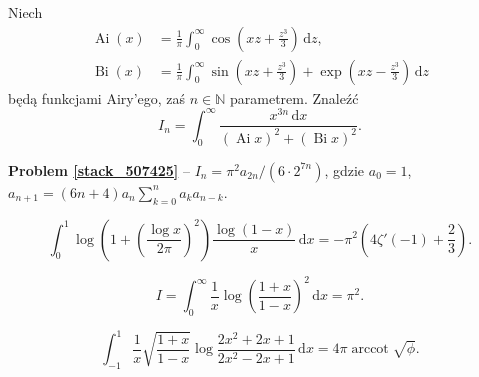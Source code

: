 
\begin{problem_with_solution}[pytanie 507425]
    \label{stack_507425}%
    Niech
    \begin{align}
        \operatorname{Ai} (x) & = \frac 1 \pi \int_0^\infty \cos \left( x z + \frac {z^3} 3 \right) \,\mathrm{d}z, \\
        \operatorname{Bi} (x) & = \frac 1 \pi \int_0^\infty \sin \left( x z + \frac {z^3} 3 \right) + \exp \left( x z - \frac {z^3} 3 \right) \,\mathrm{d}z
    \end{align}
    będą funkcjami Airy'ego, zaś $n \in \mathbb N$ parametrem.
    Znaleźć
    \begin{equation}
        I_n = \int_0^\infty \frac{x^{3n} \,\mathrm{d} x}{(\operatorname{Ai} x)^2 + (\operatorname{Bi} x)^2}.
    \end{equation}
\end{problem_with_solution}

\textbf{Problem \ref{stack_507425}} -- $I_n = \pi^2 a_{2n} / (6 \cdot 2^{7n})$, gdzie $a_0 = 1$, $a_{n+1} = (6n+4)a_n \sum_{k=0}^n a_k a_{n-k}$.



\begin{problem}[pytanie 523027]
    \label{stack_523027}%
    \begin{equation}
        \int_0^1 \log\left(1+\left(\frac{\log x}{2\pi}\right)^2 \right)\frac{\log(1-x)}x \,\mathrm{d} x=-\pi^2\left(4\zeta'(-1)+\frac23\right).
    \end{equation}
\end{problem}


\begin{problem}[pytanie 541751]
    \label{stack_541751}%
    \begin{equation}
        I = \int_0^\infty \frac{1}{x} \log \left(\frac{1+x}{1-x}\right)^2 \,\mathrm{d}x = \pi^2.
    \end{equation}
\end{problem}


\begin{problem}[pytanie 562694]
    \label{stack_562694}%
    \begin{equation}
        \int_{-1}^1 \frac{1}{x} \sqrt{\frac{1+x}{1-x}} \log \frac{2x^2+2x+1}{2x^2-2x+1} \,\mathrm{d}x = 4 \pi \operatorname{arccot} \sqrt{\phi}.
    \end{equation}
\end{problem}

